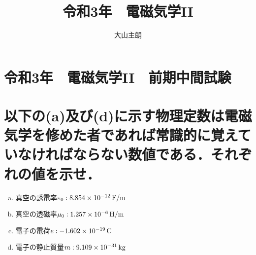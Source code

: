 \documentclass[dvipdfmx]{ujarticle}
\begin{document}
\title{令和3年　電磁気学II}
\date{}
\author{大山主朗}

\maketitle

\section*{令和3年　電磁気学II　前期中間試験}
\section{以下の(a)及び(d)に示す物理定数は電磁気学を修めた者であれば常識的に覚えていなければならない数値である．それぞれの値を示せ．}
\begin{enumerate}[(a)]
	\item 真空の誘電率$\varepsilon_{0}:8.854 \times 10^{-12}\,\rm{F/m}$
	\item 真空の透磁率$\mu_{0}:1.257 \times 10^{-6}\,\rm{H/m}$
	\item 電子の電荷$e:-1.602 \times 10^{-19}\,\rm{C}$
	\item 電子の静止質量$m:9.109\times 10^{-31}\,\rm{kg}$
\end{enumerate}
\end{document}
